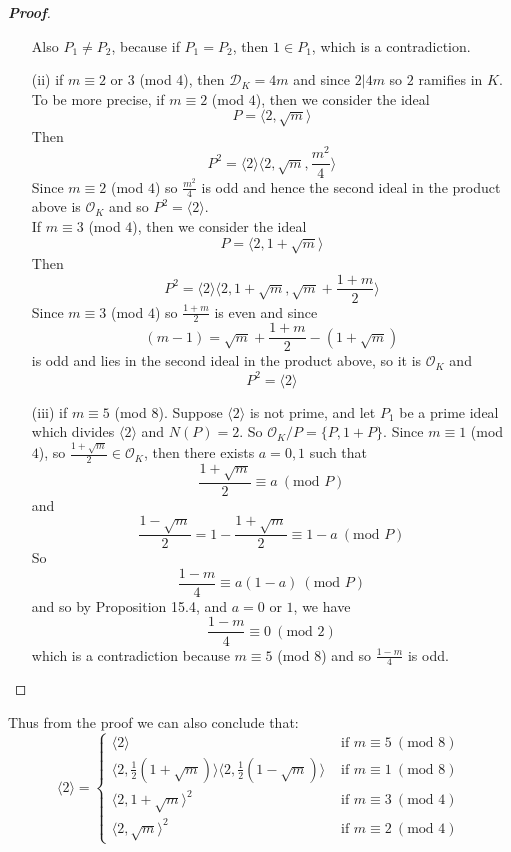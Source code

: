 \begin{proof}[\bf Proof]
\begin{enumerate}
    Also $P_1 \neq P_2$, because if $P_1=P_2$, then $1 \in P_1$, which is a contradiction.
\item[(ii)] if $m \equiv 2$ or $3$ (mod $4$), then $\mathcal{D}_K=4m$ and since $2|4m$ so $2$ ramifies in $K$.
    To be more precise, if $m \equiv 2$ (mod $4$), then we consider the ideal
    $$P=\langle 2,\sqrt{m} \rangle$$
    Then
    $$P^2=\langle 2 \rangle \langle 2,\sqrt{m},\frac{m^2}{4} \rangle$$
    Since $m \equiv 2$ (mod $4$) so $\frac{m^2}{4}$ is odd and hence the second ideal in the product above is
    $\mathcal{O}_K$ and so $P^2=\langle 2 \rangle$.\\
    If $m \equiv 3$ (mod $4$), then we consider the ideal
    $$P=\langle 2,1+\sqrt{m} \rangle$$
    Then
    $$P^2=\langle 2 \rangle \langle 2,1+\sqrt{m},\sqrt{m}+\frac{1+m}{2} \rangle$$
    Since $m \equiv 3$ (mod $4$) so $\frac{1+m}{2}$ is even and since
    $$(m-1)=\sqrt{m}+\frac{1+m}{2}-(1+\sqrt{m})$$
    is odd and lies in the second ideal in the product above, so it is $\mathcal{O}_K$ and
    $$P^2=\langle 2 \rangle$$
\item[(iii)] if $m \equiv 5$ (mod $8$). Suppose $\langle 2 \rangle$ is not prime, and let $P_1$ be a prime ideal which divides $\langle 2 \rangle$ and $N(P)=2$. So $\mathcal{O}_K/P=\{P,1+P\}$. Since $m \equiv 1$ (mod $4$), so $\frac{1+\sqrt{m}}{2} \in \mathcal{O}_K$, then
    there exists $a=0,1$ such that
    $$\frac{1+\sqrt{m}}{2} \equiv a~(\text{mod } P)$$
    and
    $$\frac{1-\sqrt{m}}{2}=1-\frac{1+\sqrt{m}}{2} \equiv 1-a~(\text{mod }P)$$
    So
    $$\frac{1-m}{4} \equiv a(1-a)~(\text{mod } P)$$
    and so by Proposition 15.4, and $a=0$ or $1$, we have
    $$\frac{1-m}{4} \equiv 0~(\text{mod } 2)$$
    which is a contradiction because $m \equiv 5$ (mod $8$) and so $\frac{1-m}{4}$ is odd.
\end{enumerate}
\end{proof}
Thus from the proof we can also conclude that:
\begin{equation*}
\langle 2 \rangle= \left\{
\begin{array}{ll}
\langle 2 \rangle & \text{ if } m \equiv 5~(\text{mod } 8)\\
\langle 2,\frac{1}{2}(1+\sqrt{m})\rangle \langle 2,\frac{1}{2}(1-\sqrt{m})\rangle & \text{ if } m \equiv 1~(\text{mod }8)\\
\langle 2,1+\sqrt{m} \rangle^2 &\text{ if } m \equiv 3~(\text{mod } 4)\\
\langle 2,\sqrt{m} \rangle^2 &\text{ if } m \equiv 2~(\text{mod } 4)
\end{array} \right.
\end{equation*}
